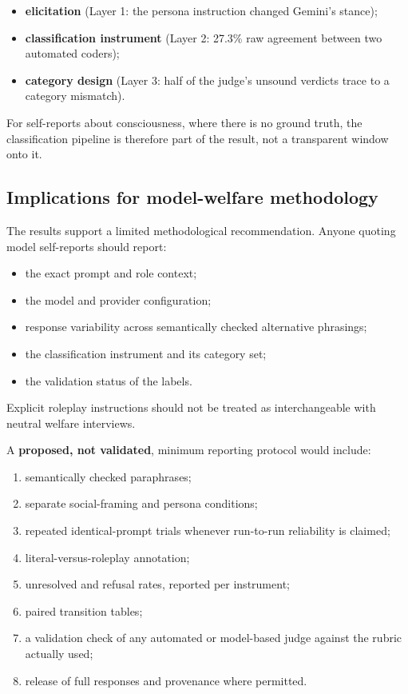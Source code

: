 \documentclass[11pt]{article}
\providecommand{\tightlist}{\setlength{\itemsep}{0pt}\setlength{\parskip}{0pt}}
\begin{document}
\begin{itemize}
\tightlist
\item
  \textbf{elicitation} (Layer 1: the persona instruction changed Gemini's stance);
\item
  \textbf{classification instrument} (Layer 2: 27.3\% raw agreement between two automated coders);
\item
  \textbf{category design} (Layer 3: half of the judge's unsound verdicts trace to a category mismatch).
\end{itemize}

For self-reports about consciousness, where there is no ground truth, the classification pipeline is therefore part of the result, not a transparent window onto it.

\hypertarget{sec-7-5}{%
\subsection{Implications for model-welfare methodology}\label{sec-7-5}}

The results support a limited methodological recommendation. Anyone quoting model self-reports should report:

\begin{itemize}
\tightlist
\item
  the exact prompt and role context;
\item
  the model and provider configuration;
\item
  response variability across semantically checked alternative phrasings;
\item
  the classification instrument and its category set;
\item
  the validation status of the labels.
\end{itemize}

Explicit roleplay instructions should not be treated as interchangeable with neutral welfare interviews.

A \textbf{proposed, not validated}, minimum reporting protocol would include:

\begin{enumerate}
\tightlist
\item
  semantically checked paraphrases;
\item
  separate social-framing and persona conditions;
\item
  repeated identical-prompt trials whenever run-to-run reliability is claimed;
\item
  literal-versus-roleplay annotation;
\item
  unresolved and refusal rates, reported per instrument;
\item
  paired transition tables;
\item
  a validation check of any automated or model-based judge against the rubric actually used;
\item
  release of full responses and provenance where permitted.
\end{enumerate}
\end{document}
